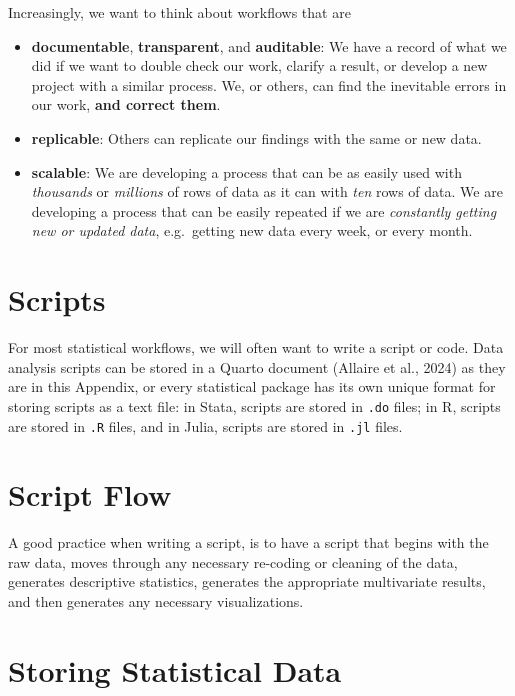 \documentclass[
  letterpaper,
  DIV=11,
  numbers=noendperiod]{scrreprt}
\providecommand{\tightlist}{%
  \setlength{\itemsep}{0pt}\setlength{\parskip}{0pt}}\usepackage{longtable,booktabs,array}
\begin{document}
Increasingly, we want to think about workflows that are

\begin{itemize}
\tightlist
\item
  \textbf{documentable}, \textbf{transparent}, and \textbf{auditable}:
  We have a record of what we did if we want to double check our work,
  clarify a result, or develop a new project with a similar process. We,
  or others, can find the inevitable errors in our work, \textbf{and
  correct them}.
\item
  \textbf{replicable}: Others can replicate our findings with the same
  or new data.
\item
  \textbf{scalable}: We are developing a process that can be as easily
  used with \emph{thousands} or \emph{millions} of rows of data as it
  can with \emph{ten} rows of data. We are developing a process that can
  be easily repeated if we are \emph{constantly getting new or updated
  data}, e.g.~getting new data every week, or every month.
\end{itemize}

\section{Scripts}\label{scripts}

For most statistical workflows, we will often want to write a script or
code. Data analysis scripts can be stored in a Quarto document (Allaire
et al., 2024) as they are in this Appendix, or every statistical package
has its own unique format for storing scripts as a text file: in Stata,
scripts are stored in \texttt{.do} files; in R, scripts are stored in
\texttt{.R} files, and in Julia, scripts are stored in \texttt{.jl}
files.

\section{Script Flow}\label{sec-script-flow}

A good practice when writing a script, is to have a script that begins
with the raw data, moves through any necessary re-coding or cleaning of
the data, generates descriptive statistics, generates the appropriate
multivariate results, and then generates any necessary visualizations.

\section{Storing Statistical Data}\label{storing-statistical-data}
\end{document}
